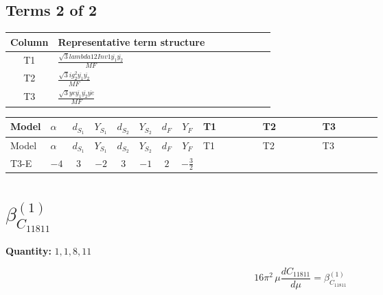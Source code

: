 \documentclass[8pt]{article}
\begin{document}
\begin{landscape}
\subsection*{Terms 2 of 2}
\begin{center}
\begin{tabular}{@{}c >{\raggedright\arraybackslash}p{0.82\linewidth}@{}}
\toprule
Column & Representative term structure \\
\midrule
T1 & \(\displaystyle \frac{\sqrt{3} lambda12Inv1 \overline{y_{1}} \overline{y_{2}}}{MF}\) \\
\midrule
T2 & \(\displaystyle \frac{\sqrt{3} i g_{2}^{2} \overline{y_{1}} \overline{y_{2}}}{MF}\) \\
\midrule
T3 & \(\displaystyle \frac{\sqrt{3} ye \overline{y_{1}} \overline{y_{2}} \overline{ye}}{MF}\) \\
\midrule
\bottomrule
\end{tabular}
\end{center}
\smallskip
\tiny
\begin{longtable}{@{}llcccccc >{\raggedright\arraybackslash}p{0.21\linewidth} >{\raggedright\arraybackslash}p{0.21\linewidth} >{\raggedright\arraybackslash}p{0.21\linewidth}@{}}
\toprule
Model & $\alpha$ & $d_{S_1}$ & $Y_{S_1}$ & $d_{S_2}$ & $Y_{S_2}$ & $d_F$ & $Y_F$ & T1 & T2 & T3 \\
\midrule
\endfirsthead
\toprule
Model & $\alpha$ & $d_{S_1}$ & $Y_{S_1}$ & $d_{S_2}$ & $Y_{S_2}$ & $d_F$ & $Y_F$ & T1 & T2 & T3 \\
\midrule
\endhead
T3-E & $-4$ & $3$ & $-2$ & $3$ & $-1$ & $2$ & $-\frac{3}{2}$ & \scriptsize\adjustbox{max width=\linewidth}{$\begin{gathered} \frac{\sqrt{3} lambda12Inv1 \overline{y_{1}} \overline{y_{2}}}{6 MF}\end{gathered}$} & \scriptsize\adjustbox{max width=\linewidth}{$\begin{gathered} \frac{\sqrt{3} i g_{2}^{2} \overline{y_{1}} \overline{y_{2}}}{6 MF}\end{gathered}$} & \scriptsize\adjustbox{max width=\linewidth}{$\begin{gathered} \frac{\sqrt{3} ye \overline{y_{1}} \overline{y_{2}} \overline{ye}}{12 MF}\end{gathered}$} \\
\midrule
\bottomrule
\end{longtable}
\clearpage
\section*{$\beta_{C_{11811}}^{(1)}$}
\noindent\textbf{Quantity: }$\mathrm{1,1,8,11}$\par\smallskip
\[16\pi^2\,\mu\frac{d C_{11811}}{d\mu}=\beta_{C_{11811}}^{(1)}\]

\end{landscape}
\end{document}
